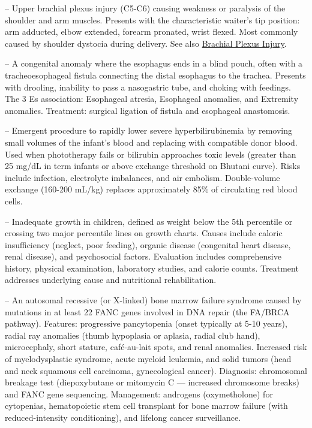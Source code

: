 -- Upper brachial plexus injury (C5-C6) causing weakness or paralysis of the shoulder and arm muscles. Presents with the characteristic waiter's tip position: arm adducted, elbow extended, forearm pronated, wrist flexed. Most commonly caused by shoulder dystocia during delivery. See also \hyperlink{Brachial Plexus Injury}{Brachial Plexus Injury}.

-- A congenital anomaly where the esophagus ends in a blind pouch, often with a tracheoesophageal fistula connecting the distal esophagus to the trachea. Presents with drooling, inability to pass a nasogastric tube, and choking with feedings. The 3 Es association: Esophageal atresia, Esophageal anomalies, and Extremity anomalies. Treatment: surgical ligation of fistula and esophageal anastomosis.

-- Emergent procedure to rapidly lower severe hyperbilirubinemia by removing small volumes of the infant's blood and replacing with compatible donor blood. Used when phototherapy fails or bilirubin approaches toxic levels (greater than 25 mg/dL in term infants or above exchange threshold on Bhutani curve). Risks include infection, electrolyte imbalances, and air embolism. Double-volume exchange (160-200 mL/kg) replaces approximately 85\% of circulating red blood cells.

-- Inadequate growth in children, defined as weight below the 5th percentile or crossing two major percentile lines on growth charts. Causes include caloric insufficiency (neglect, poor feeding), organic disease (congenital heart disease, renal disease), and psychosocial factors. Evaluation includes comprehensive history, physical examination, laboratory studies, and calorie counts. Treatment addresses underlying cause and nutritional rehabilitation.

-- An autosomal recessive (or X-linked) bone marrow failure syndrome caused by mutations in at least 22 FANC genes involved in DNA repair (the FA/BRCA pathway). Features: progressive pancytopenia (onset typically at 5-10 years), radial ray anomalies (thumb hypoplasia or aplasia, radial club hand), microcephaly, short stature, café-au-lait spots, and renal anomalies. Increased risk of myelodysplastic syndrome, acute myeloid leukemia, and solid tumors (head and neck squamous cell carcinoma, gynecological cancer). Diagnosis: chromosomal breakage test (diepoxybutane or mitomycin C — increased chromosome breaks) and FANC gene sequencing. Management: androgens (oxymetholone) for cytopenias, hematopoietic stem cell transplant for bone marrow failure (with reduced-intensity conditioning), and lifelong cancer surveillance.

